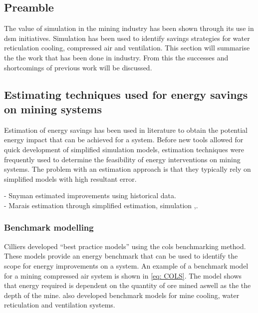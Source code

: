	\subsection{Preamble}
	The value of simulation in  the mining industry has been shown through its use in \gls{dsm} initiatives. Simulation has been used to identify savings strategies for water reticulation cooling, compressed air and ventilation. This section will summarise the the work that has been done in industry. From this the successes and shortcomings of previous work will be discussed.
	
		\subsection{Estimating techniques used for energy savings on mining systems }
		Estimation of energy savings has been used in literature to obtain the potential energy impact that can be achieved for a system. Before new tools allowed for quick development of simplified simulation models, estimation techniques were frequently used to determine the feasibility of energy interventions on mining systems. The problem with an estimation approach is that they typically rely on simplified models with high resultant error.
		\par 
		- Snyman estimated improvements using historical data.\cite{Snyman2011Masters}\\
		- Marais estimation through simplified estimation, simulation \cite{Marais2012PhD},\cite{marais2013simplification}.
		
		\subsubsection{Benchmark modelling}
		Cilliers \cite{Cilliers2015PHD} developed \enquote{best practice models} using the \gls{cols} benchmarking method. These models provide an energy benchmark that can be used to identify the scope for energy improvements on a system. An example of a benchmark model for a mining compressed air system is shown in \cref{eq: COLS}. The model shows that energy required is dependent on the quantity of ore mined aswell as the the depth of the mine. \cite{Cilliers2015PHD} also developed benchmark models for mine cooling, water reticulation and ventilation systems.

